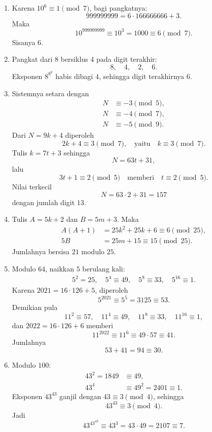 \documentclass[12pt]{scrartcl}
\begin{document}
\begin{enumerate}[resume]
	\item Karena $10^6 \equiv 1 \pmod{7}$, bagi pangkatnya:
	\[ 999999999 = 6 \cdot 166666666 + 3. \]
	Maka
	\[ 10^{999999999} \equiv 10^3 = 1000 \equiv 6 \pmod{7}. \]
	Sisanya $6$.

	\item Pangkat dari $8$ bersiklus $4$ pada digit terakhir:
	\[ 8, \quad 4, \quad 2, \quad 6. \]
	Eksponen $8^{8^8}$ habis dibagi $4$, sehingga digit terakhirnya $6$.

	\item Sistemnya setara dengan
	\begin{align*}
	N &\equiv -3 \pmod{5}, \\
	N &\equiv -4 \pmod{7}, \\
	N &\equiv -5 \pmod{9}.
	\end{align*}
	Dari $N = 9k + 4$ diperoleh
	\[ 2k + 4 \equiv 3 \pmod{7}, \quad \text{yaitu} \quad k \equiv 3 \pmod{7}. \]
	Tulis $k = 7t + 3$ sehingga
	\[ N = 63t + 31, \]
	lalu
	\[ 3t + 1 \equiv 2 \pmod{5} \quad \text{memberi} \quad t \equiv 2 \pmod{5}. \]
	Nilai terkecil
	\[ N = 63 \cdot 2 + 31 = 157 \]
	dengan jumlah digit $13$.

	\item Tulis $A = 5k + 2$ dan $B = 5m + 3$.
	Maka
	\begin{align*}
	A(A+1) &= 25k^2 + 25k + 6 \equiv 6 \pmod{25}, \\
	5B &= 25m + 15 \equiv 15 \pmod{25}.
	\end{align*}
	Jumlahnya bersisa $21$ modulo $25$.

	\item Modulo $64$, naikkan $5$ berulang kali:
	\begin{align*}
	5^2 = 25, \quad 5^4 \equiv 49, \quad 5^8 \equiv 33, \quad 5^{16} \equiv 1.
	\end{align*}
	Karena $2021 = 16 \cdot 126 + 5$, diperoleh
	\[ 5^{2021} \equiv 5^5 = 3125 \equiv 53. \]
	Demikian pula
	\[ 11^2 \equiv 57, \quad 11^4 \equiv 49, \quad 11^8 \equiv 33, \quad 11^{16} \equiv 1, \]
	dan $2022 = 16 \cdot 126 + 6$ memberi
	\[ 11^{2022} \equiv 11^6 \equiv 49 \cdot 57 \equiv 41. \]
	Jumlahnya
	\[ 53 + 41 = 94 \equiv 30. \]

	\item Modulo $100$:
	\begin{align*}
	43^2 = 1849 &\equiv 49, \\
	43^4 &\equiv 49^2 = 2401 \equiv 1.
	\end{align*}
	Eksponen $43^{43}$ ganjil dengan $43 \equiv 3 \pmod{4}$, sehingga
	\[ 43^{43} \equiv 3 \pmod{4}. \]
	Jadi
	\[ 43^{43^{43}} \equiv 43^3 = 43 \cdot 49 = 2107 \equiv 7. \]


\end{enumerate}
\end{document}
